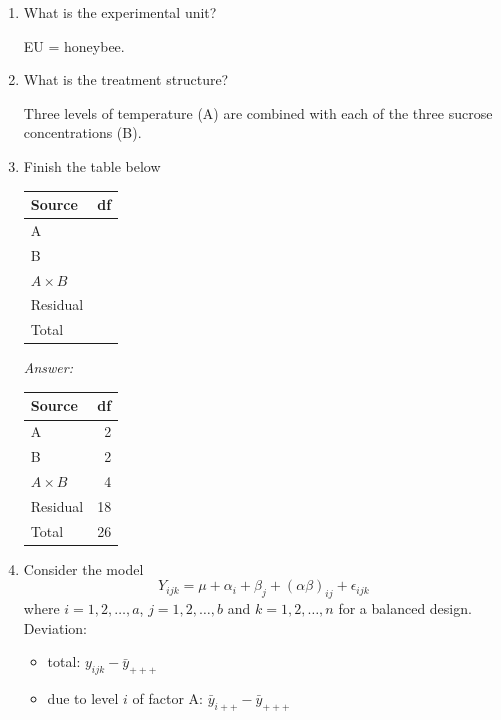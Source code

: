 \begin{enumerate}
	\item What is the experimental unit?\\
	\begin{pf}
		EU = honeybee.
	\end{pf}
	\item What is the treatment structure?\\
	\begin{pf}
		Three levels of temperature (A) are combined with each of the three sucrose concentrations (B).
	\end{pf}
	\item Finish the table below
\begin{table}[H]
	\renewcommand{\arraystretch}{1.5}
	\centering
	\begin{tabular}{lc}
		\toprule
		Source & df\\
		\hline
		A & \\
		B & \\
		$A \times B$ & \\
		Residual & \\
		\hline
		Total &\\
		\bottomrule
	\end{tabular}
\end{table}
{\it Answer: }\\
\begin{pf}
\begin{table}[H]
	\renewcommand{\arraystretch}{1.5}
	\centering
	\begin{tabular}{lr}
		\toprule
		Source & df\\
		\hline
		A & 2\\
		B & 2\\
		$A \times B$ & 4\\
		Residual & 18\\
		\hline
		Total &26\\
		\bottomrule
	\end{tabular}
\end{table}		
\end{pf}
\item 
Consider the model
$$
Y_{ijk} = \mu + \alpha_i + \beta_j + (\alpha \beta)_{ij} + \epsilon_{ijk}
$$
where $i = 1, 2, \dots, a$, $j = 1, 2, \dots, b$ and $k=1, 2, \dots, n$ for a balanced design.\\
Deviation:
\begin{itemize}
	\item total: $y_{ijk} - \bar{y}_{+++}$
	\item due to level $i$ of factor A: $\bar{y}_{i++} - \bar{y}_{+++}$

\end{itemize}
\end{enumerate}
